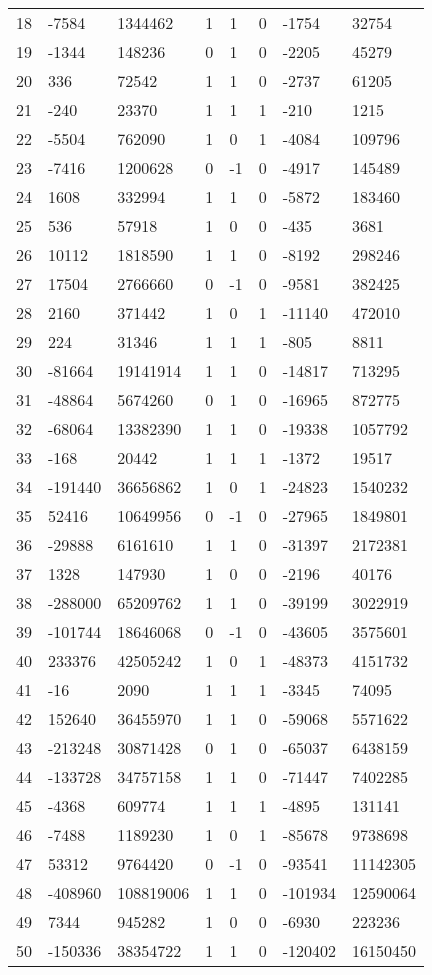 \documentclass{amsart}
\begin{document}
\begin{longtable}{|l|l|l|lllll|}
18&-7584&1344462&1&1&0&-1754&32754\\
19&-1344&148236&0&1&0&-2205&45279\\
20&336&72542&1&1&0&-2737&61205\\
21&-240&23370&1&1&1&-210&1215\\
22&-5504&762090&1&0&1&-4084&109796\\
23&-7416&1200628&0&-1&0&-4917&145489\\
24&1608&332994&1&1&0&-5872&183460\\
25&536&57918&1&0&0&-435&3681\\
26&10112&1818590&1&1&0&-8192&298246\\
27&17504&2766660&0&-1&0&-9581&382425\\
28&2160&371442&1&0&1&-11140&472010\\
29&224&31346&1&1&1&-805&8811\\
30&-81664&19141914&1&1&0&-14817&713295\\
31&-48864&5674260&0&1&0&-16965&872775\\
32&-68064&13382390&1&1&0&-19338&1057792\\
33&-168&20442&1&1&1&-1372&19517\\
34&-191440&36656862&1&0&1&-24823&1540232\\
35&52416&10649956&0&-1&0&-27965&1849801\\
36&-29888&6161610&1&1&0&-31397&2172381\\
37&1328&147930&1&0&0&-2196&40176\\
38&-288000&65209762&1&1&0&-39199&3022919\\
39&-101744&18646068&0&-1&0&-43605&3575601\\
40&233376&42505242&1&0&1&-48373&4151732\\
41&-16&2090&1&1&1&-3345&74095\\
42&152640&36455970&1&1&0&-59068&5571622\\
43&-213248&30871428&0&1&0&-65037&6438159\\
44&-133728&34757158&1&1&0&-71447&7402285\\
45&-4368&609774&1&1&1&-4895&131141\\
46&-7488&1189230&1&0&1&-85678&9738698\\
47&53312&9764420&0&-1&0&-93541&11142305\\
48&-408960&108819006&1&1&0&-101934&12590064\\
49&7344&945282&1&0&0&-6930&223236\\
50&-150336&38354722&1&1&0&-120402&16150450\\
\hline
\end{longtable}
\end{document}
